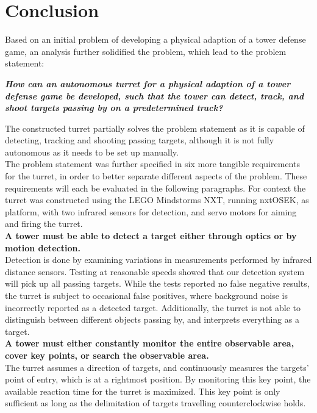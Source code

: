 \chapter{Conclusion}\label{ch:conclusion}
Based on an initial problem of developing a physical adaption of a tower defense game, an analysis further solidified the problem, which lead to the problem statement:

\begin{center}\textbf{\textit{How can an autonomous turret for a physical adaption of a tower defense game be developed, such that the tower can detect, track, and shoot targets passing by on a predetermined track?}}\end{center}

The constructed turret partially solves the problem statement as it is capable of detecting, tracking and shooting passing targets, although it is not fully autonomous as it needs to be set up manually. \\

The problem statement was further specified in six more tangible requirements for the turret, in order to better separate different aspects of the problem. These requirements will each be evaluated in the following paragraphs. For context the turret was constructed using the LEGO Mindstorms NXT, running nxtOSEK, as platform, with two infrared sensors for detection, and servo motors for aiming and firing the turret. \\

\textbf{A tower must be able to detect a target either through optics or by motion detection.} \\
Detection is done by examining variations in measurements performed by infrared distance sensors. Testing at reasonable speeds showed that our detection system will pick up all passing targets. While the tests reported no false negative results, the turret is subject to occasional false positives, where background noise is incorrectly reported as a detected target. Additionally, the turret is not able to distinguish between different objects passing by, and interprets everything as a target. \\

\textbf{A tower must either constantly monitor the entire observable area, cover key points, or search the observable area.} \\
The turret assumes a direction of targets, and continuously measures the targets' point of entry, which is at a rightmost position. By monitoring this key point, the available reaction time for the turret is maximized. This key point is only sufficient as long as the delimitation of targets travelling counterclockwise holds. \\


